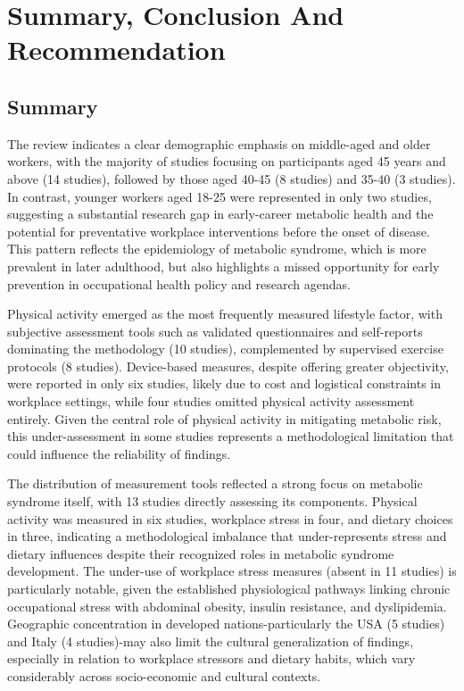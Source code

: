 \chapter{Summary, Conclusion And Recommendation}
\section{Summary}
The review indicates a clear demographic emphasis on middle-aged and older workers, with the majority of studies focusing on participants aged 45 years and above (14 studies), followed by those aged 40-45 (8 studies) and 35-40 (3 studies). In contrast, younger workers aged 18-25 were represented in only two studies, suggesting a substantial research gap in early-career metabolic health and the potential for preventative workplace interventions before the onset of disease. This pattern reflects the epidemiology of metabolic syndrome, which is more prevalent in later adulthood, but also highlights a missed opportunity for early prevention in occupational health policy and research agendas.\par
Physical activity emerged as the most frequently measured lifestyle factor, with subjective assessment tools such as validated questionnaires and self-reports dominating the methodology (10 studies), complemented by supervised exercise protocols (8 studies). Device-based measures, despite offering greater objectivity, were reported in only six studies, likely due to cost and logistical constraints in workplace settings, while four studies omitted physical activity assessment entirely. Given the central role of physical activity in mitigating metabolic risk, this under-assessment in some studies represents a methodological limitation that could influence the reliability of findings.\par
The distribution of measurement tools reflected a strong focus on metabolic syndrome itself, with 13 studies directly assessing its components. Physical activity was measured in six studies, workplace stress in four, and dietary choices in three, indicating a methodological imbalance that under-represents stress and dietary influences despite their recognized roles in metabolic syndrome development. The under-use of workplace stress measures (absent in 11 studies) is particularly notable, given the established physiological pathways linking chronic occupational stress with abdominal obesity, insulin resistance, and dyslipidemia. Geographic concentration in developed nations-particularly the USA (5 studies) and Italy (4 studies)-may also limit the cultural generalization of findings, especially in relation to workplace stressors and dietary habits, which vary considerably across socio-economic and cultural contexts.\par
